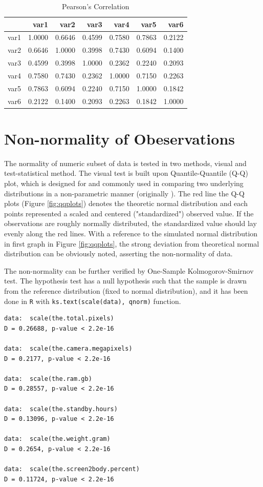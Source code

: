 \documentclass[utf8,english]{gradu3}
\begin{document}
\begin{table}[ht]
\caption{Pearson's Correlation}
\centering
\begin{tabular}{rrrrrrr}
  \hline
 & var1 & var2 & var3 & var4 & var5 & var6 \\ 
  \hline
var1 & 1.0000 & 0.6646 & 0.4599 & 0.7580 & 0.7863 & 0.2122 \\ 
  var2 & 0.6646 & 1.0000 & 0.3998 & 0.7430 & 0.6094 & 0.1400 \\ 
  var3 & 0.4599 & 0.3998 & 1.0000 & 0.2362 & 0.2240 & 0.2093 \\ 
  var4 & 0.7580 & 0.7430 & 0.2362 & 1.0000 & 0.7150 & 0.2263 \\ 
  var5 & 0.7863 & 0.6094 & 0.2240 & 0.7150 & 1.0000 & 0.1842 \\ 
  var6 & 0.2122 & 0.1400 & 0.2093 & 0.2263 & 0.1842 & 1.0000 \\ 
   \hline
\end{tabular}
\end{table}

\section{Non-normality of Obeservations}
\label{app:normality}

The normality of numeric subset of data is tested in two methods, visual and test-statistical method. The visual test is built upon Quantile-Quantile (Q-Q) plot, which is designed for and commonly used in comparing two underlying distributions in a non-parametric manner (originally \cite{wilk1968probability}). The red line the Q-Q plots (Figure \ref{fig:qqplots}) denotes the theoretic normal distribution and each points represented a scaled and centered ("standardized") observed value. If the observations are roughly normally distributed, the standardized value should lay evenly along the red lines. With a reference to the simulated normal distribution in first graph in Figure \ref{fig:qqplots}, the strong deviation from theoretical normal distribution can be obviously noted, asserting the non-normality of data.

The non-normality can be further verified by One-Sample Kolmogorov-Smirnov test. The hypothesis test has a null hypothesis such that the sample is drawn from the reference distribution (fixed to normal distribution), and it has been done in \texttt{R} with \texttt{ks.text(scale(data), qnorm)} function. 

\begin{verbatim}
data:  scale(the.total.pixels)
D = 0.26688, p-value < 2.2e-16

data:  scale(the.camera.megapixels)
D = 0.2177, p-value < 2.2e-16

data:  scale(the.ram.gb)
D = 0.28557, p-value < 2.2e-16

data:  scale(the.standby.hours)
D = 0.13096, p-value < 2.2e-16

data:  scale(the.weight.gram)
D = 0.2654, p-value < 2.2e-16

data:  scale(the.screen2body.percent)
D = 0.11724, p-value < 2.2e-16
\end{verbatim}
\end{document}
